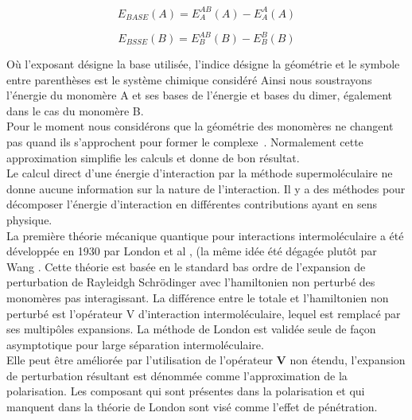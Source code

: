 \begin{equation}
E_{BASE}(A) = E_{A}^{AB}(A) - E_{A}^{A}(A)
\end{equation}

\begin{equation}
E_{BSSE}(B) = E_{B}^{AB}(B) - E_{B}^{B}(B)
\end{equation}

Où l'exposant désigne la base utilisée, l'indice désigne la géométrie et le symbole entre parenthèses est le système chimique considéré Ainsi nous soustrayons l'énergie du monomère A et ses bases de l'énergie et bases du dimer, également dans le cas du monomère B.\\

Pour le moment nous considérons que la géométrie des monomères ne changent pas quand ils s'approchent pour former le complexe . Normalement cette approximation simplifie les calculs et donne de bon résultat.\\

Le calcul direct d’une énergie d’interaction par la méthode supermoléculaire ne donne aucune information sur la nature de l’interaction. Il y a des méthodes pour décomposer l’énergie d’interaction en différentes contributions ayant en sens physique.\\

La première théorie mécanique quantique pour interactions intermoléculaire a été développée en 1930 par London et al \cite{london1930z}, (la même idée été dégagée plutôt par Wang \cite{wang1927mutual}. Cette théorie est basée en le standard bas ordre de l’expansion  de perturbation de Rayleidgh Schrödinger avec l’hamiltonien non perturbé des monomères pas interagissant. La différence entre le totale et l’hamiltonien non perturbé est l’opérateur V d’interaction intermoléculaire, lequel est remplacé par ses multipôles expansions. La méthode de London est validée seule de façon asymptotique pour large séparation intermoléculaire.\\

Elle peut être améliorée par l’utilisation de l’opérateur \textbf{V} non étendu, l’expansion de perturbation résultant est  dénommée comme l’approximation de la polarisation. Les composant qui sont présentes dans la polarisation et qui manquent dans la théorie de London sont visé comme l’effet de pénétration.\\ 

